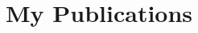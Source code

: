 \documentclass[a4paper,10pt]{book}
\begin{document}
	
\section{My Publications}
\cite{gulati_tdms_2016}




\end{document}
